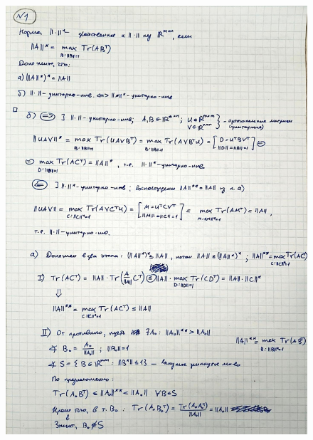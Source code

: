 \documentclass{article}
\begin{document}
	\begin{figure}[h!]
		\centering
		\includegraphics[width=0.95\linewidth]{handwritten/matcomp_hw1_bonus_1a}
	\end{figure}
	
\end{document}
